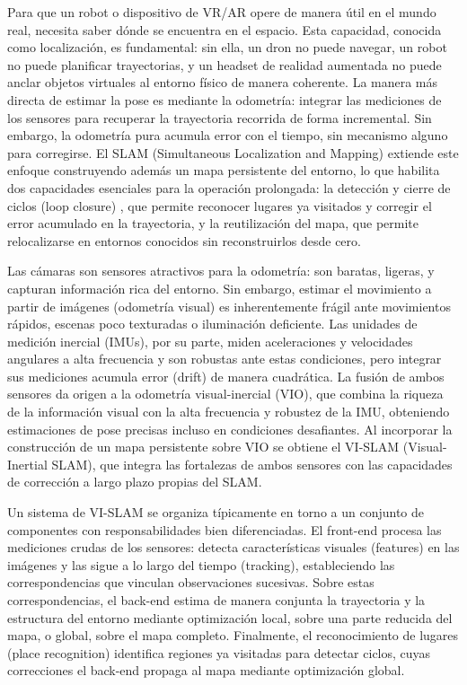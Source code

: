 Para que un robot o dispositivo de VR/AR opere de manera útil en el mundo real, necesita saber dónde se encuentra en el espacio. Esta capacidad, conocida como localización, es fundamental: sin ella, un dron no puede navegar, un robot no puede planificar trayectorias, y un headset de realidad aumentada no puede anclar objetos virtuales al entorno físico de manera coherente. La manera más directa de estimar la pose es mediante la odometría: integrar las mediciones de los sensores para recuperar la trayectoria recorrida de forma incremental. Sin embargo, la odometría pura acumula error con el tiempo, sin mecanismo alguno para corregirse. El SLAM (Simultaneous Localization and Mapping) \cite{cadena2016slam} extiende este enfoque construyendo además un mapa persistente del entorno, lo que habilita dos capacidades esenciales para la operación prolongada: la detección y cierre de ciclos (loop closure) \cite{tsintotas2022revisiting}, que permite reconocer lugares ya visitados y corregir el error acumulado en la trayectoria, y la reutilización del mapa, que permite relocalizarse en entornos conocidos sin reconstruirlos desde cero.

Las cámaras son sensores atractivos para la odometría: son baratas, ligeras, y capturan información rica del entorno. Sin embargo, estimar el movimiento a partir de imágenes (odometría visual) es inherentemente frágil ante movimientos rápidos, escenas poco texturadas o iluminación deficiente. Las unidades de medición inercial (IMUs), por su parte, miden aceleraciones y velocidades angulares a alta frecuencia y son robustas ante estas condiciones, pero integrar sus mediciones acumula error (drift) de manera cuadrática. La fusión de ambos sensores da origen a la odometría visual-inercial (VIO), que combina la riqueza de la información visual con la alta frecuencia y robustez de la IMU, obteniendo estimaciones de pose precisas incluso en condiciones desafiantes. Al incorporar la construcción de un mapa persistente sobre VIO se obtiene el VI-SLAM (Visual-Inertial SLAM), que integra las fortalezas de ambos sensores con las capacidades de corrección a largo plazo propias del SLAM.

Un sistema de VI-SLAM se organiza típicamente en torno a un conjunto de componentes con responsabilidades bien diferenciadas. El front-end procesa las mediciones crudas de los sensores: detecta características visuales (features) en las imágenes y las sigue a lo largo del tiempo (tracking), estableciendo las correspondencias que vinculan observaciones sucesivas. Sobre estas correspondencias, el back-end estima de manera conjunta la trayectoria y la estructura del entorno mediante optimización local, sobre una parte reducida del mapa, o global, sobre el mapa completo. Finalmente, el reconocimiento de lugares (place recognition) identifica regiones ya visitadas para detectar ciclos, cuyas correcciones el back-end propaga al mapa mediante optimización global.

